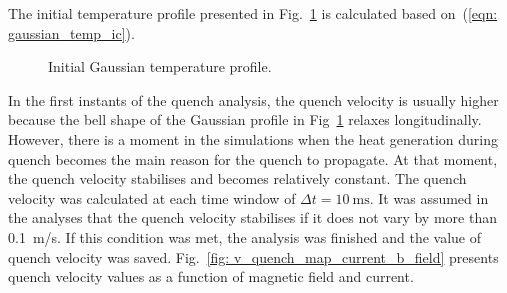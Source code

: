 The initial temperature profile presented in Fig.~\ref{fig: init_gauss_temp_distr_quench_velocity} is calculated based on~(\ref{eqn: gaussian_temp_ic}).

\begin{figure}[H]
\centering
    \caption{Initial Gaussian temperature profile.}
    \label{fig: init_gauss_temp_distr_quench_velocity}
\end{figure}

In the first instants of the quench analysis, the quench velocity is usually higher because the bell shape of the Gaussian profile in Fig~\ref{fig: init_gauss_temp_distr_quench_velocity} relaxes longitudinally. However, there is a moment in the simulations when the heat generation during quench becomes the main reason for the quench to propagate. At that moment, the quench velocity stabilises and becomes relatively constant. The quench velocity was calculated at each time window of $\Delta t=10~\text{ms}$. It was assumed in the analyses that the quench velocity stabilises if it does not vary by more than 0.1~m/s. If this condition was met, the analysis was finished and the value of quench velocity was saved. Fig.~\ref{fig: v_quench_map_current_b_field} presents quench velocity values as a function of magnetic field and current. 

